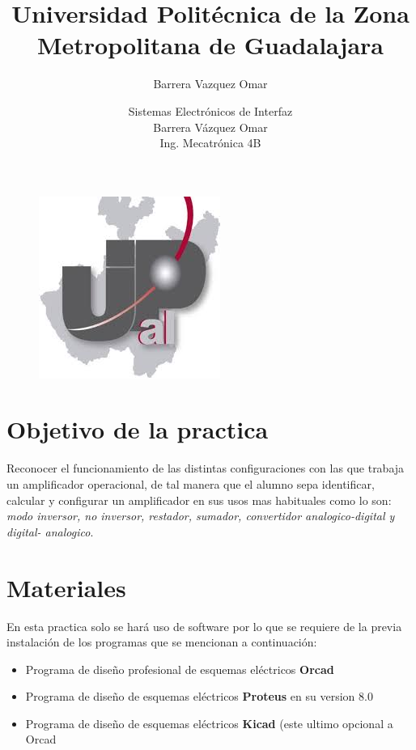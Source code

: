 \documentclass[11pt,a4paper]{article}
\author{Barrera Vazquez Omar}
\title{Universidad Politécnica de la Zona Metropolitana de Guadalajara}
\begin{document}
\maketitle

\begin{figure}[h]
\begin{center}
\includegraphics[scale=1]{1.jpeg}
\end{center}
\end{figure}

\begin{center}
\author{Sistemas Electrónicos de Interfaz\\
Barrera Vázquez Omar\\
Ing. Mecatrónica 4B\\}
\end{center}

\newpage

\section{Objetivo de la practica}

Reconocer el funcionamiento de las distintas configuraciones con las que trabaja un amplificador operacional, de tal manera que el alumno sepa identificar, calcular y configurar un amplificador en sus usos mas habituales como lo son: \emph{modo inversor, no inversor, restador, sumador, convertidor analogico-digital y digital- analogico}.

\section{Materiales}

En esta practica solo se hará uso de software por lo que se requiere de la previa instalación de los programas que se mencionan a continuación:

\begin{itemize}
\item Programa de diseño profesional de esquemas eléctricos \textbf{Orcad}
\item Programa de diseño de esquemas eléctricos \textbf{Proteus} en su version 8.0
\item Programa de diseño de esquemas eléctricos \textbf{Kicad} (este ultimo opcional a Orcad
\end{itemize}
\end{document}
